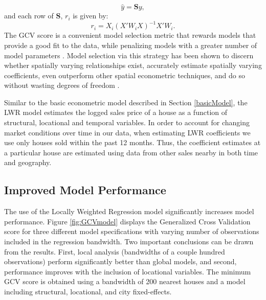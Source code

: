 \documentclass{article}\usepackage{graphicx, color}
\begin{document}
                   \begin{equation*}
                   \hat{y}=\textbf{S}y,
                   \end{equation*}
                   and each row of \textbf{S}, $r_i$ is given by:
                     \begin{equation*}
                   r_i=X_i(X'W_iX)^{-1}X'W_i.
                   \end{equation*}
The GCV score is a convenient model selection metric that rewards models that provide a good fit to the data, while penalizing models with a greater number of model parameters \citep{Loader1999, McMillen2010}. Model selection via this strategy has been shown to discern whether spatially varying relationships exist, accurately estimate spatially varying coefficients, even outperform other spatial econometric techniques, and do so without wasting degrees of freedom \citep{Paez2011, McMillen2010, McMillen2012}. 

Similar to the basic econometric model described in Section \ref{basicModel}, the LWR model estimates the logged sales price of a house as a function of structural, locational and temporal variables. In order to account for changing market conditions over time in our data, when estimating LWR coefficients we use only houses sold within the past 12 months. Thus, the coefficient estimates at a particular house are estimated using data from other sales nearby in both time and geography.

\subsection{Improved Model Performance}
The use of the Locally Weighted Regression model significantly increases model performance. Figure \ref{fig:GCVmodel} displays the Generalized Cross Validation score for three different model specifications with varying number of observations included in the regression bandwidth. Two important conclusions can be drawn from the results. First, local analysis (bandwidths of a couple hundred observations) perform significantly better than global models, and second, performance improves with the inclusion of locational variables. The minimum GCV score is obtained using a bandwidth of 200 nearest houses and a model including structural, locational, and city fixed-effects.
\end{document}

